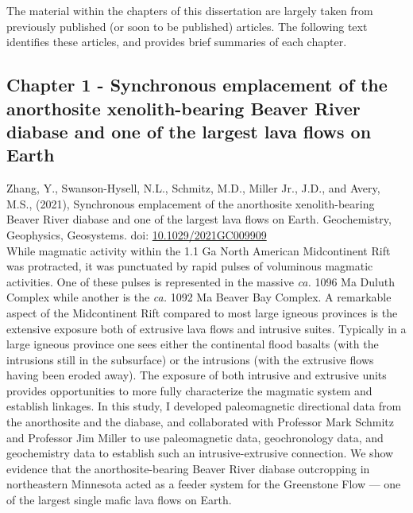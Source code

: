 \documentclass{ucbthesis}
\begin{document}
\begin{frontmatter}

\tableofcontents
\clearpage
\listoffigures
\clearpage
\listoftables

\clearpage

\begin{preface}
	
The material within the chapters of this dissertation are largely taken from previously published (or soon to be published) articles. The following text identifies these articles, and provides brief summaries of each chapter.

\subsection{Chapter 1 - Synchronous emplacement of the anorthosite xenolith-bearing Beaver River diabase and one of the largest lava flows on Earth}

Zhang, Y., Swanson-Hysell, N.L., Schmitz, M.D., Miller Jr., J.D., and Avery, M.S., (2021), Synchronous emplacement of the anorthosite xenolith-bearing Beaver River diabase and one of the largest lava flows on Earth. Geochemistry, Geophysics, Geosystems. doi: \url{10.1029/2021GC009909}
\\

While magmatic activity within the 1.1 Ga North American Midcontinent Rift was protracted, it was punctuated by rapid pulses of voluminous magmatic activities. One of these pulses is represented in the massive \textit{ca.} 1096 Ma Duluth Complex while another is the \textit{ca.} 1092 Ma Beaver Bay Complex. A remarkable aspect of the Midcontinent Rift compared to most large igneous provinces is the extensive exposure both of extrusive lava flows and intrusive suites. Typically in a large igneous province one sees either the continental flood basalts (with the intrusions still in the subsurface) or the intrusions (with the extrusive flows having been eroded away). The exposure of both intrusive and extrusive units provides opportunities to more fully characterize the magmatic system and establish linkages. In this study, I developed paleomagnetic directional data from the anorthosite and the diabase, and collaborated with Professor Mark Schmitz and Professor Jim Miller to use paleomagnetic data, geochronology data, and geochemistry data to establish such an intrusive-extrusive connection. We show evidence that the anorthosite-bearing Beaver River diabase outcropping in northeastern Minnesota acted as a feeder system for the Greenstone Flow --- one of the largest single mafic lava flows on Earth.


\end{preface}
\end{frontmatter}
\end{document}
